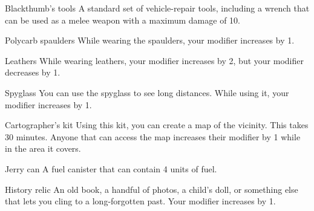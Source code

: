 \begin{describe}{Blackthumb's tools}
  A standard set of vehicle-repair tools, including a wrench that can be used as a melee weapon with a maximum damage of 10.
\end{describe}

\begin{describe}{Polycarb spaulders}
  While wearing the spaulders, your  modifier increases by 1.
\end{describe}

\begin{describe}{Leathers}
  While wearing leathers, your  modifier increases by 2, but your  modifier decreases by 1.
\end{describe}

\begin{describe}{Spyglass}
  You can use the spyglass to see long distances. While using it, your  modifier increases by 1.
\end{describe}

\begin{describe}{Cartographer's kit}
  Using this kit, you can create a map of the vicinity. This takes 30 minutes. Anyone that can access the map increases their  modifier by 1 while in the area it covers.
\end{describe}

\begin{describe}{Jerry can}
  A fuel canister that can contain 4 units of fuel.
\end{describe}

\begin{describe}{History relic}
  An old book, a handful of photos, a child's doll, or something else that lets you cling to a long-forgotten past. Your  modifier increases by 1.
\end{describe}
